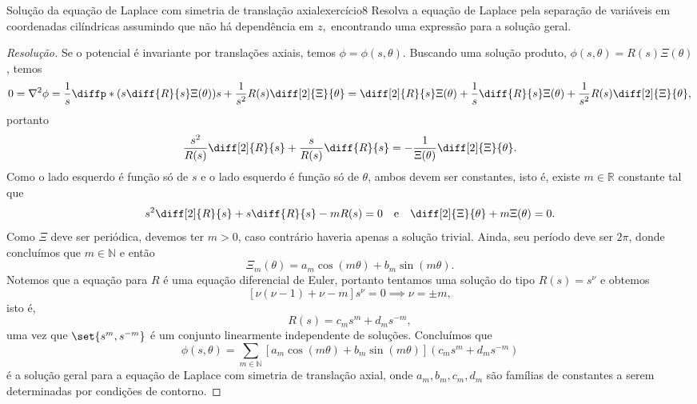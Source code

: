 \begin{exercício}{Solução da equação de Laplace com simetria de translação axial}{exercício8}
    Resolva a equação de Laplace pela separação de variáveis em coordenadas cilíndricas assumindo que não há dependência em \(z,\) encontrando uma expressão para a solução geral.
\end{exercício}
\begin{proof}[Resolução]
    Se o potencial é invariante por translações axiais, temos \(\phi = \phi(s, \theta)\). Buscando uma solução produto, \(\phi(s, \theta) = R(s)\Xi(\theta)\), temos
    \begin{equation*}
        0 = \nabla^2 \phi = \frac1s \diffp*{\left(s \diff{R}{s} \Xi(\theta)\right)}{s} + \frac{1}{s^2}R(s)\diff[2]{\Xi}{\theta} = \diff[2]{R}{s}\Xi(\theta) + \frac{1}{s} \diff{R}{s}\Xi(\theta) + \frac{1}{s^2} R(s) \diff[2]{\Xi}{\theta},
    \end{equation*}
    portanto
    \begin{equation*}
        \frac{s^2}{R(s)} \diff[2]{R}{s} + \frac{s}{R(s)} \diff{R}{s} = - \frac{1}{\Xi(\theta)} \diff[2]{\Xi}{\theta}.
    \end{equation*}
    Como o lado esquerdo é função só de \(s\) e o lado esquerdo é função só de \(\theta\), ambos devem ser constantes, isto é, existe \(m\in \mathbb{R}\) constante tal que
    \begin{equation*}
        s^2 \diff[2]{R}{s} + s\diff{R}{s} - m R(s) = 0 \quad\text{e}\quad \diff[2]{\Xi}{\theta} + m \Xi(\theta) = 0.
    \end{equation*}
    Como \(\Xi\) deve ser periódica, devemos ter \(m > 0\), caso contrário haveria apenas a solução trivial. Ainda, seu período deve ser \(2\pi\), donde concluímos que \(m \in \mathbb{N}\) e então
    \begin{equation*}
        \Xi_m(\theta) = a_m\cos(m\theta) + b_m \sin(m\theta).
    \end{equation*}
    Notemos que a equação para \(R\) é uma equação diferencial de Euler, portanto tentamos uma solução do tipo \(R(s) = s^\nu\) e obtemos
    \begin{equation*}
        \left[\nu(\nu - 1) + \nu - m\right]s^\nu = 0 \implies \nu = \pm m,
    \end{equation*}
    isto é,
    \begin{equation*}
        R(s) = c_ms^m + d_m s^{-m},
    \end{equation*}
    uma vez que \(\set{s^m, s^{-m}}\) é um conjunto linearmente independente de soluções. Concluímos que
    \begin{equation*}
        \phi(s, \theta) = \sum_{m \in \mathbb{N}} \left[a_m \cos(m\theta) + b_m\sin(m\theta)\right](c_m s^m + d_m s^{-m})
    \end{equation*}
    é a solução geral para a equação de Laplace com simetria de translação axial, onde \(a_m, b_m, c_m, d_m\) são famílias de constantes a serem determinadas por condições de contorno.
\end{proof}
